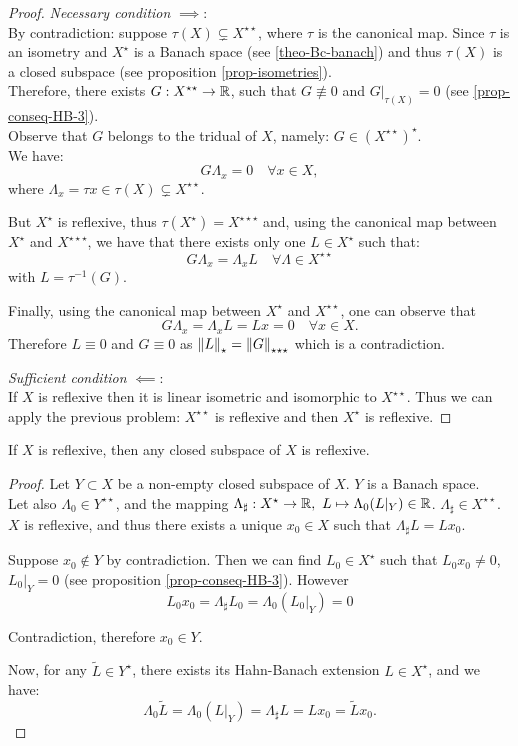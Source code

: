 \begin{proof}\textit{Necessary condition} $\implies$:\\
	By contradiction: suppose $\tau(X) \subsetneq X^{\star\star}$, where $\tau$ is the canonical map.
	Since $\tau$ is an isometry and $X^\star$ is a Banach space (see \vref{theo-Bc-banach}) and thus $\tau(X)$ is a closed subspace (see proposition \vref{prop-isometries}).\\
	Therefore, there exists $G : X^{\star\star} \to \mathbb R$, such that $G\not \equiv 0$ and $G|_{\tau(X)}=0$ (see \vref{prop-conseq-HB-3}).\\
	Observe that $G$ belongs to the tridual of $X$, namely:	$G \in (X^{\star\star})^{\star}$.\\
	We have:
	$$G \Lambda_x = 0 \quad \forall x \in X,$$
	where $\Lambda_x = \tau x \in \tau(X) \subsetneq X^{\star\star}$.
		
	But $X^\star$ is reflexive, thus $\tau(X^\star) = X^{\star\star\star}$ and, using the canonical map between $X^\star$ and $X^{\star\star\star}$,
	we have that there exists only one $L\in X^\star$ such that: 
	$$G \Lambda_x =
	\Lambda_x L
	\quad \forall \Lambda \in X^{\star\star}$$
	with $L=\tau^{-1}(G)$. 
	
	Finally, using the canonical map between $X^\star$ and $X^{\star\star}$, one can observe that
	$$G \Lambda_x =
	\Lambda_x L=
	Lx = 0
	\quad \forall x \in X.$$
	Therefore $L \equiv 0$ and $G \equiv 0$ as $\left\lVert L\right\rVert_\star = \left\lVert G\right\rVert_{\star\star\star}$ which is a contradiction.
	
	\textit{Sufficient condition} $\impliedby$:\\
	If $X$ is reflexive then it is linear isometric and isomorphic to $X^{\star\star}$. Thus we can apply the previous problem: $X^{\star\star}$ is reflexive and then $X^{\star} $ is reflexive.
\end{proof}

\begin{theo}
	If $X$ is reflexive, then any closed subspace of $X$ is reflexive.
\end{theo}

\begin{proof}
	Let $Y \subset X$ be a non-empty closed subspace of $X$. $Y$ is a Banach space.\\
	Let also $\Lambda_0 \in Y ^{\star\star}$, and the mapping $\Lambda_{\sharp} : X^\star \to \mathbb R, \ L \mapsto \Lambda_0 (L|_Y) \in \mathbb R$. $\Lambda_{\sharp} \in X^{\star\star}$.
	$X$ is reflexive, and thus there exists a unique $x_0\in X$ such that $\Lambda_{\sharp} L = L x_0$.
	
	Suppose $x_0 \notin Y$ by contradiction. Then we can find $L_0 \in X^{\star}$ such that $L_0 x_0 \neq 0$, $L_0 |_Y =0$ (see proposition \vref{prop-conseq-HB-3}).
	However
	$$L_0 x_0 = \Lambda_{\sharp} L_0 = \Lambda_0 (L_0 |_Y) =0$$

	Contradiction, therefore $x_0 \in Y$.
	
	Now, for any $\tilde L \in Y^\star$, there exists its Hahn-Banach extension $L \in X^\star$, and we have:
	$$\Lambda_0\tilde L = \Lambda_0(L|_Y) = \Lambda_{\sharp} L = L x_0 = \tilde L x_0.$$
\end{proof}

